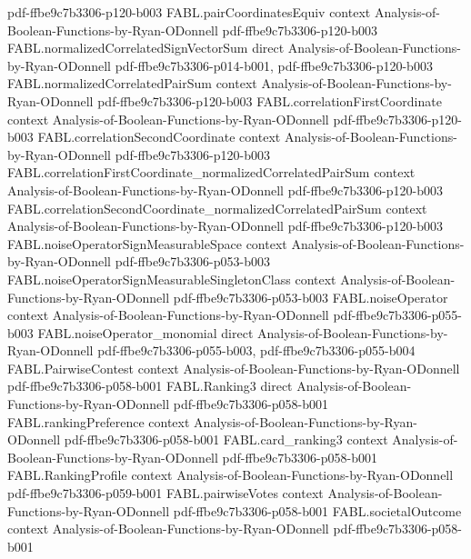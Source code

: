 \begin{theorem}
  {pdf-ffbe9c7b3306-p120-b003}
\proofstep
  {FABL.pairCoordinatesEquiv}
  {context}
  {Analysis-of-Boolean-Functions-by-Ryan-ODonnell}
  {pdf-ffbe9c7b3306-p120-b003}
\proofstep
  {FABL.normalizedCorrelatedSignVectorSum}
  {direct}
  {Analysis-of-Boolean-Functions-by-Ryan-ODonnell}
  {pdf-ffbe9c7b3306-p014-b001,
    pdf-ffbe9c7b3306-p120-b003}
\proofstep
  {FABL.normalizedCorrelatedPairSum}
  {context}
  {Analysis-of-Boolean-Functions-by-Ryan-ODonnell}
  {pdf-ffbe9c7b3306-p120-b003}
\proofstep
  {FABL.correlationFirstCoordinate}
  {context}
  {Analysis-of-Boolean-Functions-by-Ryan-ODonnell}
  {pdf-ffbe9c7b3306-p120-b003}
\proofstep
  {FABL.correlationSecondCoordinate}
  {context}
  {Analysis-of-Boolean-Functions-by-Ryan-ODonnell}
  {pdf-ffbe9c7b3306-p120-b003}
\proofstep
  {FABL.correlationFirstCoordinate_normalizedCorrelatedPairSum}
  {context}
  {Analysis-of-Boolean-Functions-by-Ryan-ODonnell}
  {pdf-ffbe9c7b3306-p120-b003}
\proofstep
  {FABL.correlationSecondCoordinate_normalizedCorrelatedPairSum}
  {context}
  {Analysis-of-Boolean-Functions-by-Ryan-ODonnell}
  {pdf-ffbe9c7b3306-p120-b003}
\proofstep
  {FABL.noiseOperatorSignMeasurableSpace}
  {context}
  {Analysis-of-Boolean-Functions-by-Ryan-ODonnell}
  {pdf-ffbe9c7b3306-p053-b003}
\proofstep
  {FABL.noiseOperatorSignMeasurableSingletonClass}
  {context}
  {Analysis-of-Boolean-Functions-by-Ryan-ODonnell}
  {pdf-ffbe9c7b3306-p053-b003}
\proofstep
  {FABL.noiseOperator}
  {context}
  {Analysis-of-Boolean-Functions-by-Ryan-ODonnell}
  {pdf-ffbe9c7b3306-p055-b003}
\proofstep
  {FABL.noiseOperator_monomial}
  {direct}
  {Analysis-of-Boolean-Functions-by-Ryan-ODonnell}
  {pdf-ffbe9c7b3306-p055-b003,
    pdf-ffbe9c7b3306-p055-b004}
\proofstep
  {FABL.PairwiseContest}
  {context}
  {Analysis-of-Boolean-Functions-by-Ryan-ODonnell}
  {pdf-ffbe9c7b3306-p058-b001}
\proofstep
  {FABL.Ranking3}
  {direct}
  {Analysis-of-Boolean-Functions-by-Ryan-ODonnell}
  {pdf-ffbe9c7b3306-p058-b001}
\proofstep
  {FABL.rankingPreference}
  {context}
  {Analysis-of-Boolean-Functions-by-Ryan-ODonnell}
  {pdf-ffbe9c7b3306-p058-b001}
\proofstep
  {FABL.card_ranking3}
  {context}
  {Analysis-of-Boolean-Functions-by-Ryan-ODonnell}
  {pdf-ffbe9c7b3306-p058-b001}
\proofstep
  {FABL.RankingProfile}
  {context}
  {Analysis-of-Boolean-Functions-by-Ryan-ODonnell}
  {pdf-ffbe9c7b3306-p059-b001}
\proofstep
  {FABL.pairwiseVotes}
  {context}
  {Analysis-of-Boolean-Functions-by-Ryan-ODonnell}
  {pdf-ffbe9c7b3306-p058-b001}
\proofstep
  {FABL.societalOutcome}
  {context}
  {Analysis-of-Boolean-Functions-by-Ryan-ODonnell}
  {pdf-ffbe9c7b3306-p058-b001}

\end{theorem}
